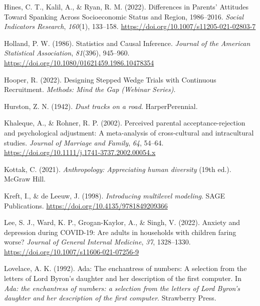 \documentclass[
  letterpaper,
  DIV=11,
  numbers=noendperiod]{scrreprt}
\newlength{\cslhangindent}
\newlength{\cslentryspacingunit} %
\newenvironment{CSLReferences}[2] %
 {%
  \setlength{\parindent}{0pt}
  \ifodd #1
  \let\oldpar\par
  \def\par{\hangindent=\cslhangindent\oldpar}
  \fi
  \setlength{\parskip}{#2\cslentryspacingunit}
 }%
 {}
\begin{document}
\begin{CSLReferences}{1}{0}
\leavevmode{}%
Hines, C. T., Kalil, A., \& Ryan, R. M. (2022). {Differences in Parents'
Attitudes Toward Spanking Across Socioeconomic Status and Region,
1986--2016}. \emph{Social Indicators Research}, \emph{160}(1), 133--158.
\url{https://doi.org/10.1007/s11205-021-02803-7}

\leavevmode{}%
Holland, P. W. (1986). {Statistics and Causal Inference}. \emph{Journal
of the American Statistical Association}, \emph{81}(396), 945--960.
\url{https://doi.org/10.1080/01621459.1986.10478354}

\leavevmode{}%
Hooper, R. (2022). {Designing Stepped Wedge Trials with Continuous
Recruitment}. \emph{Methods: Mind the Gap (Webinar Series)}.

\leavevmode{}%
Hurston, Z. N. (1942). \emph{Dust tracks on a road}. HarperPerennial.

\leavevmode{}%
Khaleque, A., \& Rohner, R. P. (2002). Perceived parental
acceptance-rejection and psychological adjustment: A meta-analysis of
cross-cultural and intracultural studies. \emph{Journal of Marriage and
Family}, \emph{64}, 54--64.
\url{https://doi.org/10.1111/j.1741-3737.2002.00054.x}

\leavevmode{}%
Kottak, C. (2021). \emph{Anthropology: Appreciating human diversity}
(19th ed.). McGraw Hill.

\leavevmode{}%
Kreft, I., \& de Leeuw, J. (1998). \emph{Introducing multilevel
modeling}. SAGE Publications.
\url{https://doi.org/10.4135/9781849209366}

\leavevmode{}%
Lee, S. J., Ward, K. P., Grogan-Kaylor, A., \& Singh, V. (2022). Anxiety
and depression during {COVID-19}: Are adults in households with children
faring worse? \emph{Journal of General Internal Medicine}, \emph{37},
1328--1330. \url{https://doi.org/10.1007/s11606-021-07256-9}

\leavevmode{}%
Lovelace, A. K. (1992). Ada: The enchantress of numbers: A selection
from the letters of {L}ord {B}yron's daughter and her description of the
first computer. In \emph{Ada: the enchantress of numbers: a selection
from the letters of {L}ord {B}yron's daughter and her description of the
first computer}. Strawberry Press.


\end{CSLReferences}
\end{document}
